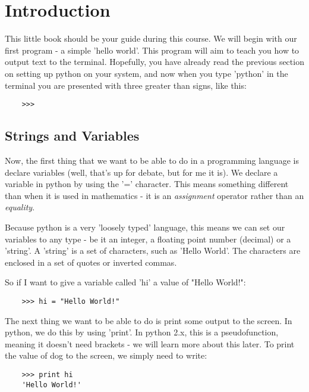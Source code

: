 \section{Introduction}

This little book should be your guide during this course. We will begin with
our first program - a simple 'hello world'. This program will aim to teach you
how to output text to the terminal. Hopefully, you have already read the
previous section on setting up python on your system, and now when you type
'python' in the terminal you are presented with three greater than signs, like
this:

\begin{lstlisting}
    >>>
\end{lstlisting}

\subsection{Strings and Variables}

Now, the first thing that we want to be able to do in a programming language is
declare variables (well, that's up for debate, but for me it is). We declare a
variable in python by using the '=' character. This means something different
than when it is used in mathematics - it is an \emph{assignment} operator rather
than an \emph{equality}.

Because python is a very 'loosely typed' language, this means we can set our
variables to any type - be it an integer, a floating point number (decimal) or
a 'string'. A 'string' is a set of characters, such as 'Hello World'. The
characters are enclosed in a set of quotes or inverted commas.

So if I want to give a variable called 'hi' a value of "Hello World!":

\begin{lstlisting}
    >>> hi = "Hello World!"
\end{lstlisting}

The next thing we want to be able to do is print some output to the screen. In
python, we do this by using 'print'. In python 2.x, this is a pseudofunction,
meaning it doesn't need brackets - we will learn more about this later. To print
the value of dog to the screen, we simply need to write:

\begin{lstlisting}
    >>> print hi
    'Hello World!'
\end{lstlisting}

